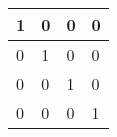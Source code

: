 \begin{tabular}{|l|l|l|l|}
\hline
1&0&0&0\\\hline
0&1&0&0\\\hline
0&0&1&0\\\hline
0&0&0&1\\\hline
\end{tabular}
